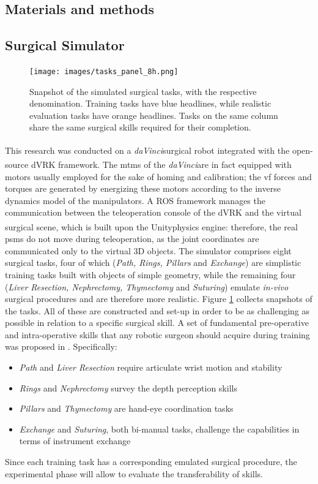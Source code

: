 \documentclass{article}
\newcommand{\cright}{\textsuperscript{\textregistered}\phantom{..}}
\begin{document}
\begin{multicols}{2}
\section{Materials and methods}
\subsection{Surgical Simulator}

\begin{figure}
  \centering
      \texttt{[image: images/tasks\_panel\_8h.png]}
      \caption{Snapshot of the simulated surgical tasks, with the respective denomination. Training tasks have blue headlines, while realistic evaluation tasks have orange headlines. Tasks on the same column share the same surgical skills required for their completion.}
      \label{fig:taskspanel}
\end{figure}

This research was conducted on a \textit{daVinci}\cright surgical robot integrated with the open-source dVRK \cite{Kazanzidesf2014} framework. The \acp{mtm} of the \textit{daVinci}\cright are in fact equipped with motors usually employed for the sake of homing and calibration; the \ac{vf} forces and torques are generated by energizing these motors according to the inverse dynamics model of the manipulators. A ROS framework manages the communication between the teleoperation console of the dVRK and the virtual surgical scene, which is built upon the Unity\cright physics engine: therefore, the real \acp{psm} do not move during teleoperation, as the joint coordinates are communicated only to the virtual 3D objects.
The simulator comprises eight surgical tasks, four of which (\textit{Path, Rings, Pillars} and \textit{Exchange}) are simplistic training tasks built with objects of simple geometry, while the remaining four (\textit{Liver Resection, Nephrectomy, Thymectomy} and \textit{Suturing}) emulate \textit{in-vivo} surgical procedures and are therefore more realistic. Figure \ref{fig:taskspanel} collects snapshots of the tasks. All of these are constructed and set-up in order to be as challenging as possible in relation to a specific surgical skill. A set of fundamental pre-operative and intra-operative skills that any robotic surgeon should acquire during training was proposed in \cite{Smith2014}. Specifically:

\begin{itemize}
  \item \textit{Path} and \textit{Liver Resection} require articulate wrist motion and stability
  \item \textit{Rings} and \textit{Nephrectomy} survey the depth perception skills
  \item \textit{Pillars} and \textit{Thymectomy} are hand-eye coordination tasks
  \item \textit{Exchange} and \textit{Suturing}, both bi-manual tasks, challenge the capabilities in terms of instrument exchange 
\end{itemize}
Since each training task has a corresponding emulated surgical procedure, the experimental phase will allow to evaluate the transferability of skills.


\end{multicols}
\end{document}

